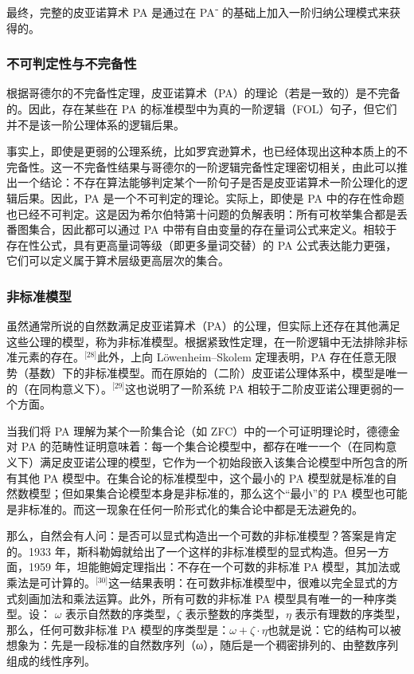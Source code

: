 最终，完整的皮亚诺算术 PA 是通过在 PA⁻ 的基础上加入一阶归纳公理模式来获得的。
\subsubsection{不可判定性与不完备性}
根据哥德尔的不完备性定理，皮亚诺算术（PA）的理论（若是一致的）是不完备的。因此，存在某些在 PA 的标准模型中为真的一阶逻辑（FOL）句子，但它们并不是该一阶公理体系的逻辑后果。

事实上，即使是更弱的公理系统，比如罗宾逊算术，也已经体现出这种本质上的不完备性。这一不完备性结果与哥德尔的一阶逻辑完备性定理密切相关，由此可以推出一个结论：不存在算法能够判定某个一阶句子是否是皮亚诺算术一阶公理化的逻辑后果。因此，PA 是一个不可判定的理论。实际上，即使是 PA 中的存在性命题也已经不可判定。这是因为希尔伯特第十问题的负解表明：所有可枚举集合都是丢番图集合，因此都可以通过 PA 中带有自由变量的存在量词公式来定义。相较于存在性公式，具有更高量词等级（即更多量词交替）的 PA 公式表达能力更强，它们可以定义属于算术层级更高层次的集合。
\subsubsection{非标准模型}
虽然通常所说的自然数满足皮亚诺算术（PA）的公理，但实际上还存在其他满足这些公理的模型，称为非标准模型。根据紧致性定理，在一阶逻辑中无法排除非标准元素的存在。\(^\text{[28]}\)此外，上向 Löwenheim–Skolem 定理表明，PA 存在任意无限势（基数）下的非标准模型。而在原始的（二阶）皮亚诺公理体系中，模型是唯一的（在同构意义下）。\(^\text{[29]}\)这也说明了一阶系统 PA 相较于二阶皮亚诺公理更弱的一个方面。

当我们将 PA 理解为某个一阶集合论（如 ZFC）中的一个可证明理论时，德德金对 PA 的范畴性证明意味着：每一个集合论模型中，都存在唯一一个（在同构意义下）满足皮亚诺公理的模型，它作为一个初始段嵌入该集合论模型中所包含的所有其他 PA 模型中。在集合论的标准模型中，这个最小的 PA 模型就是标准的自然数模型；但如果集合论模型本身是非标准的，那么这个“最小”的 PA 模型也可能是非标准的。而这一现象在任何一阶形式化的集合论中都是无法避免的。

那么，自然会有人问：是否可以显式构造出一个可数的非标准模型？答案是肯定的。1933 年，斯科勒姆就给出了一个这样的非标准模型的显式构造。但另一方面，1959 年，坦能鲍姆定理指出：不存在一个可数的非标准 PA 模型，其加法或乘法是可计算的。\(^\text{[30]}\)这一结果表明：在可数非标准模型中，很难以完全显式的方式刻画加法和乘法运算。此外，所有可数的非标准 PA 模型具有唯一的一种序类型。设： $\omega$ 表示自然数的序类型，$\zeta$ 表示整数的序类型，$\eta$ 表示有理数的序类型，那么，任何可数非标准 PA 模型的序类型是：$\omega + \zeta \cdot \eta$也就是说：它的结构可以被想象为：先是一段标准的自然数序列（ω），随后是一个稠密排列的、由整数序列组成的线性序列。

